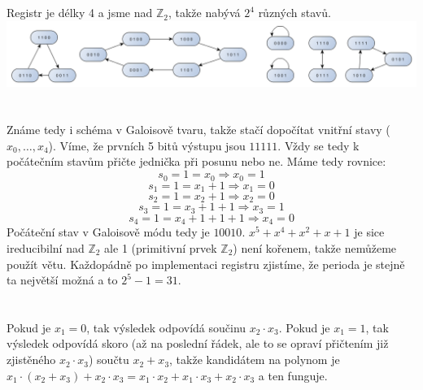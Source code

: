 \documentclass[12pt, a4paper]{article}
\begin{document}
\section{}
Registr je délky 4 a jsme nad $\mathbb{Z}_2$, takže nabývá $2^4$ různých stavů.\\
\includegraphics[width=\textwidth]{graf}

\section{}
Známe tedy i schéma v Galoisově tvaru, takže stačí dopočítat vnitřní stavy ($x_0, \dots, x_4$). Víme, že prvních 5 bitů výstupu jsou $11111$. Vždy se tedy k počátečním stavům přičte jednička při posunu nebo ne. Máme tedy rovnice:
$$s_0 = 1 = x_0 \Rightarrow x_0 = 1$$
$$s_1 = 1 = x_1 + 1 \Rightarrow x_1 = 0$$
$$s_2 = 1 = x_2 + 1 \Rightarrow x_2 = 0$$
$$s_3 = 1 = x_3 + 1 + 1 \Rightarrow x_3 = 1$$
$$s_4 = 1 = x_4 + 1 + 1 + 1 \Rightarrow x_4 = 0$$
Počáteční stav v Galoisově módu tedy je $10010$. $x^5+x^4+x^2+x+1$ je sice ireducibilní nad $\mathbb{Z}_2$ ale 1 (primitivní prvek $\mathbb{Z}_2$) není kořenem, takže nemůžeme použít větu. Každopádně po implementaci registru zjistíme, že perioda je stejně ta největší možná a to $2^5-1=31$.

\section{}
Pokud je $x_1 = 0$, tak výsledek odpovídá součinu $x_2 \cdot x_3$. Pokud je $x_1 = 1$, tak výsledek odpovídá skoro (až na poslední řádek, ale to se opraví přičtením již zjistěného $x_2 \cdot x_3$) součtu $x_2+x_3$, takže kandidátem na polynom je $x_1 \cdot (x_2+x_3) + x_2 \cdot x_3 = x_1 \cdot x_2 + x_1 \cdot x_3 + x_2 \cdot x_3$ a ten funguje.
\end{document}
